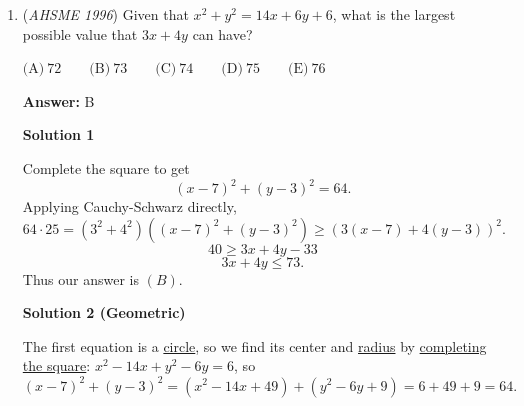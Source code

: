 \begin{enumerate}
 Thus, the sum of the first $1225$ terms is $2401$.  We have to add $9$ more $2$s to get to the $1234^{th}$ term, which gives us $2419$, or option $\boxed{B}$.

 Note:  If you notice that the above sums form $1 + 3 + 5 + 7... + (2n-1) = n^2$, the fact that $49^2$ appears at the end should come as no surprise.

 



\textbf{Solution 2 (Alcumus)}

The $k$th appearance of 1 is at position $1 + 2 + \dots + k = \frac{k(k + 1)}{2}$. Then there are $k$ 1's and $\frac{k(k + 1)}{2} - k = \frac{k(k - 1)}{2}$ 2's among the first $\frac{k(k + 1)}{2}$ numbers, so the sum of these $\frac{k(k + 1)}{2}$ terms is $k + k(k - 1) = k^2$.

 When $k = 49$, $\frac{k(k + 1)}{2} = 1225$, and when $k = 50$, $\frac{k(k + 1)}{2} = 1275$.

 The sum of the first 1225 terms is $49^2 = 2401$. The numbers in positions 1226 through 1234 are all 2's, so their sum is $(1234 - 1226 + 1) \cdot 2 = 18$. Therefore, the sum of the first 1234 terms is $2401 + 18 = \boxed{2419}$.

 


	\item (\textit{AHSME 1996}) Given that $x^2 + y^2 = 14x + 6y + 6$, what is the largest possible value that $3x + 4y$ can have? 


 $\text{(A)}\ 72\qquad\text{(B)}\ 73\qquad\text{(C)}\ 74\qquad\text{(D)}\ 75\qquad\text{(E)}\ 76$

 \textbf{Answer: }B



\textbf{Solution 1}

Complete the square to get 
 \[(x-7)^2 + (y-3)^2 = 64.\]Applying Cauchy-Schwarz directly,
 \[64\cdot25=(3^2+4^2)((x-7)^2 + (y-3)^2) \ge (3(x-7)+4(y-3))^2.\]
 \[40 \ge 3x+4y-33\]
 \[3x+4y \le 73.\]Thus our answer is $\boxed{(B)}$.

 



\textbf{Solution 2 (Geometric)}

The first equation is a \href{https://artofproblemsolving.com/wiki/index.php?title=Circle}{circle}, so we find its center and \href{https://artofproblemsolving.com/wiki/index.php?title=Radius}{radius} by \href{https://artofproblemsolving.com/wiki/index.php?title=Completing\_the\_square}{completing the square}: $x^2 - 14x + y^2 - 6y = 6$, so 
 \[(x-7)^2 + (y-3)^2 = (x^2- 14x + 49) + (y^2 - 6y + 9) = 6 + 49 + 9 = 64.\]


\end{enumerate}
